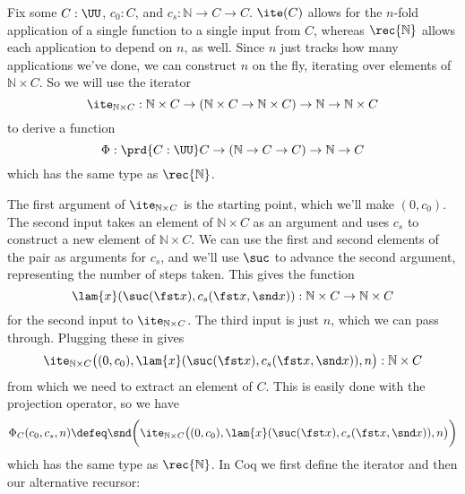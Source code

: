 \soln  Fix some $C :
\UU$, $c_{0} : C$, and $c_{s} : \mathbb{N} \to C \to C$.
$\ite(C)$ allows for the $n$-fold application of a single function to a single
input from $C$, whereas $\rec{\mathbb{N}}$ allows each application to
depend on $n$, as well.  Since $n$ just tracks how many applications we've
done, we can construct $n$ on the fly, iterating over elements of $\mathbb{N}
\times C$.  So we will use the iterator
\[
  \ite_{\mathbb{N} \times C} : \mathbb{N} \times C \to (\mathbb{N} \times C
  \to \mathbb{N} \times C) \to \mathbb{N} \to \mathbb{N} \times C
\]
to derive a function
\[
  \Phi : \prd{C : \UU} C \to (\mathbb{N} \to C \to C) \to
  \mathbb{N} \to C
\]
which has the same type as $\rec{\mathbb{N}}$.  

The first argument of $\ite_{\mathbb{N} \times C}$ is the starting point,
which we'll make $(0, c_{0})$.  The second input takes an element of
$\mathbb{N} \times C$ as an argument and uses $c_{s}$ to construct a new
element of $\mathbb{N} \times C$.  We can use the first and second elements of
the pair as arguments for $c_{s}$, and we'll use $\suc$ to advance the second
argument, representing the number of steps taken.  This gives the function
\[
  \lam{x}(\suc(\fst x), c_{s}(\fst x, \snd x)) 
  : \mathbb{N} \times C \to \mathbb{N} \times C
\]
for the second input to $\ite_{\mathbb{N} \times C}$.  The third input is just
$n$, which we can pass through.  Plugging these in gives
\[
  \ite_{\mathbb{N} \times C}\big(
  (0, c_{0}),
  \lam{x}(\suc(\fst x), c_{s}(\fst x, \snd x)),
  n
  \big)
  : \mathbb{N} \times C
\]
from which we need to extract an element of $C$.  This is easily done with the
projection operator, so we have
\[
  \Phi_{C}(c_{0}, c_{s}, n) \defeq
  \snd\bigg(
    \ite_{\mathbb{N} \times C}\big(
    (0, c_{0}),
    \lam{x}(\suc(\fst x), c_{s}(\fst x, \snd x)),
    n
    \big)
  \bigg)
\]
which has the same type as $\rec{\mathbb{N}}$.  In Coq we first define the
iterator and then our alternative recursor:

